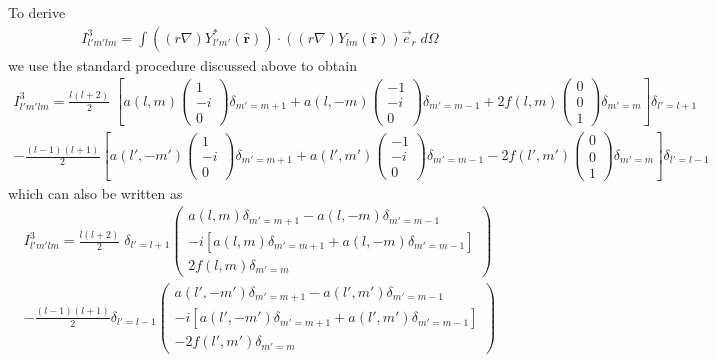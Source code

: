 \documentclass[aps,prb,floatfix,epsfig,singlecolumn,showpacs,preprintnumbers]{revtex4}
\renewcommand{\vr}{{\mathbf{r}}}
\begin{document}
To derive 
\begin{eqnarray}
I^3_{l'm'lm}=\int ((r\nabla)Y^*_{l'm'}(\hat{\vr}))\cdot  ((r\nabla)Y_{lm}(\hat{\vr})) \vec{e}_r\; d\Omega
\end{eqnarray}
we use the standard procedure discussed above to obtain
%
\begin{eqnarray}
I^3_{l'm'lm}=\frac{l(l+2)}{2}\;
\left[
a(l,m)
\left(
\begin{array}{c}
1\\
-i\\
0
\end{array}
\right)
\delta_{m'=m+1}
+a(l,-m)
\left(
\begin{array}{c}
-1\\
-i\\
0
\end{array}
\right)
\delta_{m'=m-1}
+2 f(l,m)
\left(
\begin{array}{c}
0\\
0\\
1
\end{array}
\right)
\delta_{m'=m}
\right]\delta_{l'=l+1}
\nonumber\\
-\frac{(l-1)(l+1)}{2}
\left[
a(l',-m')
\left(
\begin{array}{c}
1\\
-i\\
0
\end{array}
\right)
\delta_{m'=m+1}
+a(l',m')
\left(
\begin{array}{c}
-1\\
-i\\
0
\end{array}
\right)
\delta_{m'=m-1}
-2 f(l',m')
\left(
\begin{array}{c}
0\\
0\\
1
\end{array}
\right)
\delta_{m'=m}
\right]\delta_{l'=l-1}
\end{eqnarray}
which can also be written as
\begin{eqnarray}
I^3_{l'm'lm}=\frac{l(l+2)}{2}\;\delta_{l'=l+1}
\left(
\begin{array}{c}
a(l,m) \delta_{m'=m+1}- a(l,-m)\delta_{m'=m-1}\\
-i[a(l,m)\delta_{m'=m+1}+a(l,-m)\delta_{m'=m-1} ]\\
2 f(l,m)\delta_{m'=m}
\end{array}
\right)
\nonumber\\
-\frac{(l-1)(l+1)}{2}
\delta_{l'=l-1}
\left(
\begin{array}{c}
a(l',-m')\delta_{m'=m+1}-a(l',m')\delta_{m'=m-1}\\
-i[a(l',-m')\delta_{m'=m+1}+a(l',m')\delta_{m'=m-1}]\\
-2 f(l',m')\delta_{m'=m}
\end{array}
\right)
\end{eqnarray}
\end{document}
